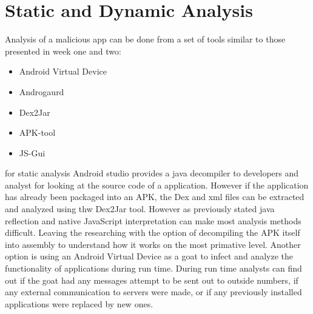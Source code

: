 \documentclass[letterpaper,12pt,titlepage,onecolumn]{IEEEtran}
\begin{document}
\section{Static and Dynamic Analysis}
Analysis of a malicious app can be done from a set of tools similar to those presented in week one and two:
\begin{itemize}
    \item Android Virtual Device
    \item Androgaurd
    \item Dex2Jar
    \item APK-tool
    \item JS-Gui
\end{itemize}

for static analysis Android studio provides a java decompiler to developers and analyst for looking at the source code of a application. However if the application has already been packaged into an APK, the Dex and xml files can be extracted and analyzed using thw Dex2Jar tool. However as previously stated java reflection and native JavaScript interpretation can make most analysis methods difficult. Leaving the researching with the option of decompiling the APK itself into assembly to understand how it works on the most primative level. Another option is using an Android Virtual Device as a goat to infect and analyze the functionality of applications during run time. During run time analysts can find out if the goat had any messages attempt to be sent out to outside numbers, if any external communication to servers were made, or if any previously installed applications were replaced by new ones.
\end{document}
